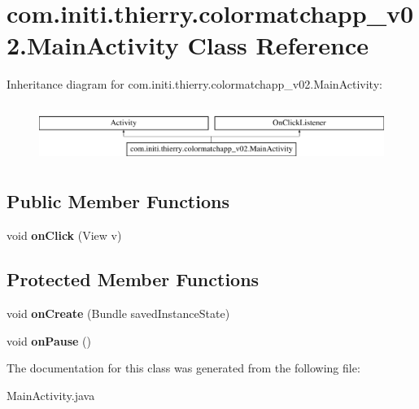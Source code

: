 \hypertarget{classcom_1_1initi_1_1thierry_1_1colormatchapp__v02_1_1_main_activity}{}\section{com.\+initi.\+thierry.\+colormatchapp\+\_\+v02.\+Main\+Activity Class Reference}
\label{classcom_1_1initi_1_1thierry_1_1colormatchapp__v02_1_1_main_activity}
Inheritance diagram for com.\+initi.\+thierry.\+colormatchapp\+\_\+v02.\+Main\+Activity\+:\begin{figure}[H]
\begin{center}
\leavevmode
\includegraphics[height=1.891892cm]{classcom_1_1initi_1_1thierry_1_1colormatchapp__v02_1_1_main_activity}
\end{center}
\end{figure}
\subsection*{Public Member Functions}
\begin{DoxyCompactItemize}
\item 
void {\bfseries on\+Click} (View v)\hypertarget{classcom_1_1initi_1_1thierry_1_1colormatchapp__v02_1_1_main_activity_a2b16e484fd259228bbf1cc6ee42d8eab}{}\label{classcom_1_1initi_1_1thierry_1_1colormatchapp__v02_1_1_main_activity_a2b16e484fd259228bbf1cc6ee42d8eab}

\end{DoxyCompactItemize}
\subsection*{Protected Member Functions}
\begin{DoxyCompactItemize}
\item 
void {\bfseries on\+Create} (Bundle saved\+Instance\+State)\hypertarget{classcom_1_1initi_1_1thierry_1_1colormatchapp__v02_1_1_main_activity_ae0bd870462110982d9a4b3bc389b8f39}{}\label{classcom_1_1initi_1_1thierry_1_1colormatchapp__v02_1_1_main_activity_ae0bd870462110982d9a4b3bc389b8f39}

\item 
void {\bfseries on\+Pause} ()\hypertarget{classcom_1_1initi_1_1thierry_1_1colormatchapp__v02_1_1_main_activity_a184047863eec0aa27c4d41a3e5a37529}{}\label{classcom_1_1initi_1_1thierry_1_1colormatchapp__v02_1_1_main_activity_a184047863eec0aa27c4d41a3e5a37529}

\end{DoxyCompactItemize}


The documentation for this class was generated from the following file\+:\begin{DoxyCompactItemize}
\item 
Main\+Activity.\+java\end{DoxyCompactItemize}
